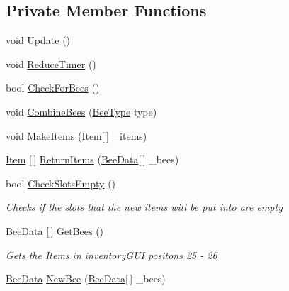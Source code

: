 \subsection*{Private Member Functions}
\begin{DoxyCompactItemize}
\item 
void \hyperlink{class_bee_game_1_1_bee_1_1_apiary_abdaff537d5798876ccbcb8dff82df4d7}{Update} ()
\item 
void \hyperlink{class_bee_game_1_1_bee_1_1_apiary_a13ae008ce398b022806823585c6eb6de}{Reduce\+Timer} ()
\item 
bool \hyperlink{class_bee_game_1_1_bee_1_1_apiary_ac8dbe3e7896909c1fd16f4f998f7b137}{Check\+For\+Bees} ()
\item 
void \hyperlink{class_bee_game_1_1_bee_1_1_apiary_a5e302eef156ac1610cb37720d41b8077}{Combine\+Bees} (\hyperlink{namespace_bee_game_1_1_enums_a9376a1582db99d20c756e24de728944f}{Bee\+Type} type)
\item 
void \hyperlink{class_bee_game_1_1_bee_1_1_apiary_aaa6f9e38434722e3db40ae753a8bb752}{Make\+Items} (\hyperlink{struct_bee_game_1_1_items_1_1_item}{Item}\mbox{[}$\,$\mbox{]} \+\_\+items)
\item 
\hyperlink{struct_bee_game_1_1_items_1_1_item}{Item} \mbox{[}$\,$\mbox{]} \hyperlink{class_bee_game_1_1_bee_1_1_apiary_abb65875e61a806c8b2787d0c7d8229bd}{Return\+Items} (\hyperlink{struct_bee_game_1_1_bee_1_1_bee_data}{Bee\+Data}\mbox{[}$\,$\mbox{]} \+\_\+bees)
\item 
bool \hyperlink{class_bee_game_1_1_bee_1_1_apiary_aa142a57151e9d0ea82e06b22ee530137}{Check\+Slots\+Empty} ()
\begin{DoxyCompactList}\small\item\em Checks if the slots that the new items will be put into are empty \end{DoxyCompactList}\item 
\hyperlink{struct_bee_game_1_1_bee_1_1_bee_data}{Bee\+Data} \mbox{[}$\,$\mbox{]} \hyperlink{class_bee_game_1_1_bee_1_1_apiary_a4aca0b267cdb220e7377165e30eb0324}{Get\+Bees} ()
\begin{DoxyCompactList}\small\item\em Gets the \hyperlink{namespace_bee_game_1_1_items}{Items} in \hyperlink{class_bee_game_1_1_inventory_1_1_inventory_base_a48dcba7ad7bfa1bed8c9ae290fb32857}{inventory\+G\+UI} positons 25 -\/ 26 \end{DoxyCompactList}\item 
\hyperlink{struct_bee_game_1_1_bee_1_1_bee_data}{Bee\+Data} \hyperlink{class_bee_game_1_1_bee_1_1_apiary_ae3a597a3e45de14511f10d17bd5d539b}{New\+Bee} (\hyperlink{struct_bee_game_1_1_bee_1_1_bee_data}{Bee\+Data}\mbox{[}$\,$\mbox{]} \+\_\+bees)

\end{DoxyCompactItemize}

